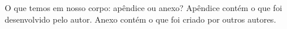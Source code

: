 
O que temos em nosso corpo: apêndice ou anexo? Apêndice contém o que foi desenvolvido pelo autor. Anexo contém o que foi criado por outros autores.

\label{ap:lorem-ipsum}

\lipsum[1]